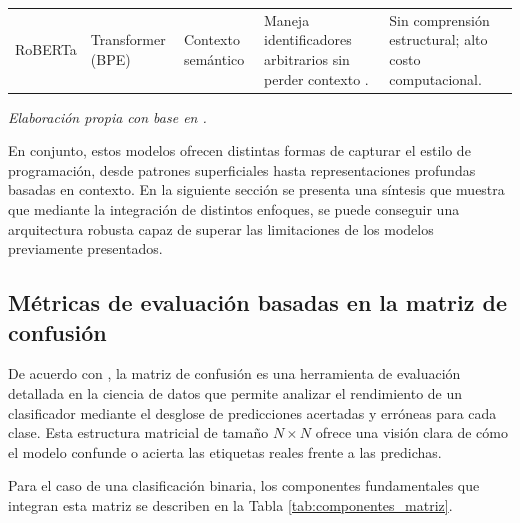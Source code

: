 {\begin{xltabular}{\textwidth}{>{\raggedright\arraybackslash}p{2.2cm} >{\raggedright\arraybackslash}p{2.2cm} >{\raggedright\arraybackslash}p{2cm} X X}
    RoBERTa & Transformer (BPE) & Contexto semántico & Maneja identificadores arbitrarios sin perder contexto \cite{Liu2019RoBERTa}. & Sin comprensión estructural; alto costo computacional. \\

\end{xltabular}

\nopagebreak
\footnotesize\textit{Elaboración propia con base en \cite{Burrows2007Ngrams, Zhang2015CharCNN, Liu2019RoBERTa}.}

} %

En conjunto, estos modelos ofrecen distintas formas de capturar el estilo de programación, desde patrones superficiales hasta representaciones profundas basadas en contexto. En la siguiente sección se presenta una síntesis que muestra que mediante la integración de distintos enfoques, se puede conseguir una arquitectura robusta capaz de superar las limitaciones de los modelos previamente presentados. 

\subsection{Métricas de evaluación basadas en la matriz de confusión}

De acuerdo con \cite{Sathyanarayanan2024}, la matriz de confusión es una herramienta de evaluación detallada en la ciencia de datos que permite analizar el rendimiento de un clasificador mediante el desglose de predicciones acertadas y erróneas para cada clase. Esta estructura matricial de tamaño $N \times N$ ofrece una visión clara de cómo el modelo confunde o acierta las etiquetas reales frente a las predichas.



Para el caso de una clasificación binaria, los componentes fundamentales que integran esta matriz se describen en la Tabla \ref{tab:componentes_matriz}.

